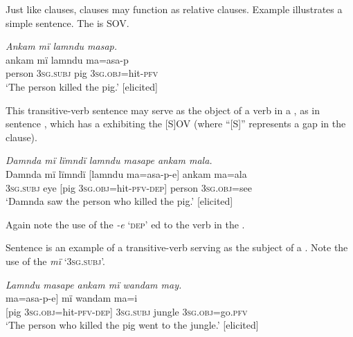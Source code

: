 Just like  clauses,  clauses may function as relative clauses. Example  illustrates a simple  sentence. The  is SOV.

\ea%
    \label{ex:complex:86}
          \textit{Ankam mï lamndu masap.}\\
\gll    ankam  mï      lamndu  ma=asa-p\\
    person  3\textsc{sg.subj}  pig      3\textsc{sg.obj}=hit-\textsc{pfv}\\
\glt `The person killed the pig.’ [elicited]
\z



This transitive-verb sentence may serve as the object of a verb in a , as in sentence , which has a  exhibiting the  [S]OV (where “[S]” represents a gap in the clause).

\ea%
    \label{ex:complex:87}
          \textit{Damnda mï lïmndï lamndu masape ankam mala.}\\
\gll Damnda  mï      lïmndï  [lamndu  ma=asa-p-e]      ankam     ma=ala\\
    [name]    3\textsc{sg.subj}  eye    [pig    3\textsc{sg.obj}=hit-\textsc{pfv-dep]}  person    3\textsc{sg.obj}=see\\
\glt `Damnda saw the person who killed the pig.’ [elicited]
\z

Again note the use of the  \textit{-e} ‘\textsc{dep}’ ed to the verb in the .

Sentence  is an example of a transitive-verb  serving as the subject of a . Note the use of the  \textit{mï} ‘\textsc{3sg.subj}’.

\ea%
    \label{ex:complex:88}
          \textit{Lamndu masape ankam mï wandam may.}\\
\gll    {[lamndu}  ma=asa-p-e]      mï      wandam ma=i\\
    {[pig}    \textsc{3sg.obj}=hit-\textsc{pfv-dep]}  \textsc{3sg.subj}  jungle    3\textsc{sg.obj}=go.\textsc{pfv}\\
\glt `The person who killed the pig went to the jungle.’ [elicited]
\z

